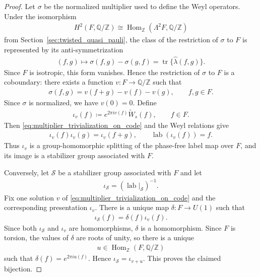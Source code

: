 \documentclass[sn-mathphys-num]{sn-jnl}
\theoremstyle{definition}
\numberwithin{equation}{section}
\theoremstyle{definition}
\def\CS {{\mathcal S}}
\def\IQ{\mathbb{Q}}
\def\IZ{{\mathbb{Z}}}
\def\hl{{\hat \lambda}}
\def\Hom{\operatorname{Hom}}
\def\tr{\operatorname{tr}}
\def\lab{\operatorname{lab}}
\begin{document}
\begin{proof}
 Let $\sigma$ be the
normalized multiplier used to define the Weyl operators. Under the isomorphism
\begin{align}
    H^2(F,\IQ/\IZ)
    \cong
    \Hom_{\IZ}(\Lambda^2F,\IQ/\IZ)
\end{align}
from Section~\ref{sec:twisted_quasi_pauli}, the class of the restriction of
$\sigma$ to $F$ is represented by its anti-symmetrization
\begin{align}
    (f,g)\longmapsto
    \sigma(f,g)-\sigma(g,f)
    =\tr\{\hl(f,g)\}.
\end{align}
Since $F$ is isotropic, this form vanishes. Hence the restriction of $\sigma$
to $F$ is a coboundary: there exists a function $v:F\to\IQ/\IZ$ such that
\begin{align}\label{eq:multiplier_trivialization_on_code}
    \sigma(f,g)=v(f+g)-v(f)-v(g),
    \qquad f,g\in F.
\end{align}
Since $\sigma$ is normalized, we have $v(0)=0$. Define
\begin{align}
    \iota_v(f)
    \coloneqq
    e^{2\pi i v(f)}\widetilde W_s(f),
    \qquad f\in F.
\end{align}
Then \eqref{eq:multiplier_trivialization_on_code} and the Weyl relations give
\begin{align}
    \iota_v(f)\iota_v(g)=\iota_v(f+g),
    \qquad
    \lab(\iota_v(f))=f.
\end{align}
Thus $\iota_v$ is a group-homomorphic splitting of the phase-free label map
over $F$, and its image is a stabilizer group associated with $F$.


Conversely, let $\CS$ be a stabilizer group associated with $F$ and let
\begin{align}
    \iota_{\CS}=(\lab|_{\CS})^{-1}.
\end{align}
Fix one solution $v$ of
\eqref{eq:multiplier_trivialization_on_code} and the corresponding
presentation $\iota_v$. There is a unique map $\delta:F\to U(1)$ such that
\begin{align}
    \iota_{\CS}(f)=\delta(f)\iota_v(f).
\end{align}
Since both $\iota_{\CS}$ and $\iota_v$ are homomorphisms, $\delta$ is a
homomorphism. Since $F$ is torsion, the values of $\delta$ are roots of
unity, so there is a unique
\begin{align}
    u\in\Hom_{\IZ}(F,\IQ/\IZ)
\end{align}
such that $\delta(f)=e^{2\pi i u(f)}$. Hence
$\iota_{\CS}=\iota_{v+u}$. This proves the claimed bijection.

\end{proof}
\end{document}
